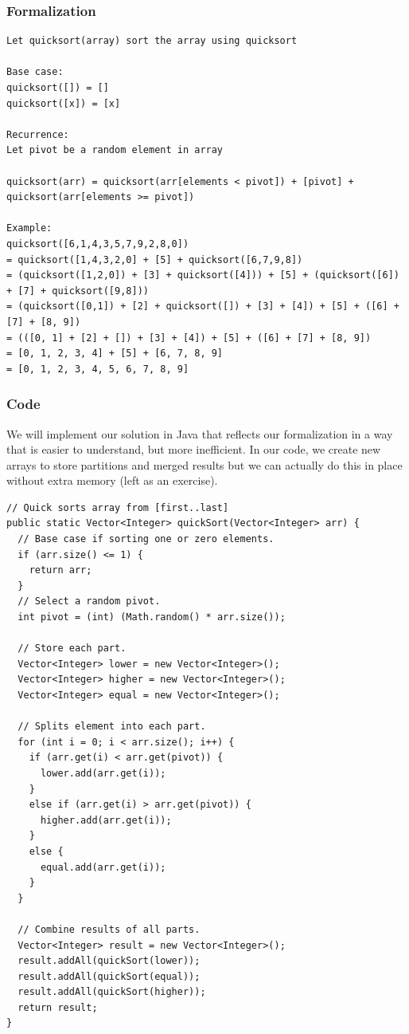 \documentclass[11pt,oneside]{book}
\begin{document}
\subsubsection{Formalization}

\begin{lstlisting}
Let quicksort(array) sort the array using quicksort

Base case:
quicksort([]) = []
quicksort([x]) = [x]

Recurrence:
Let pivot be a random element in array

quicksort(arr) = quicksort(arr[elements < pivot]) + [pivot] + quicksort(arr[elements >= pivot])

Example:
quicksort([6,1,4,3,5,7,9,2,8,0])
= quicksort([1,4,3,2,0] + [5] + quicksort([6,7,9,8])
= (quicksort([1,2,0]) + [3] + quicksort([4])) + [5] + (quicksort([6]) + [7] + quicksort([9,8]))
= (quicksort([0,1]) + [2] + quicksort([]) + [3] + [4]) + [5] + ([6] + [7] + [8, 9])
= (([0, 1] + [2] + []) + [3] + [4]) + [5] + ([6] + [7] + [8, 9])
= [0, 1, 2, 3, 4] + [5] + [6, 7, 8, 9]
= [0, 1, 2, 3, 4, 5, 6, 7, 8, 9]
\end{lstlisting}

\subsubsection{Code}

We will implement our solution in Java that reflects our formalization in a way that is easier to understand, but more inefficient. In our code, we create new arrays to store partitions and merged results but we can actually do this in place without extra memory (left as an exercise).

\begin{lstlisting}
// Quick sorts array from [first..last]
public static Vector<Integer> quickSort(Vector<Integer> arr) {
  // Base case if sorting one or zero elements.
  if (arr.size() <= 1) {
    return arr;
  }
  // Select a random pivot.
  int pivot = (int) (Math.random() * arr.size());

  // Store each part.
  Vector<Integer> lower = new Vector<Integer>();
  Vector<Integer> higher = new Vector<Integer>();
  Vector<Integer> equal = new Vector<Integer>();

  // Splits element into each part.
  for (int i = 0; i < arr.size(); i++) {
    if (arr.get(i) < arr.get(pivot)) {
      lower.add(arr.get(i));
    }
    else if (arr.get(i) > arr.get(pivot)) {
      higher.add(arr.get(i));
    }
    else {
      equal.add(arr.get(i));
    }
  }

  // Combine results of all parts.
  Vector<Integer> result = new Vector<Integer>();
  result.addAll(quickSort(lower));
  result.addAll(quickSort(equal));
  result.addAll(quickSort(higher));
  return result;
}
\end{lstlisting}
\end{document}
